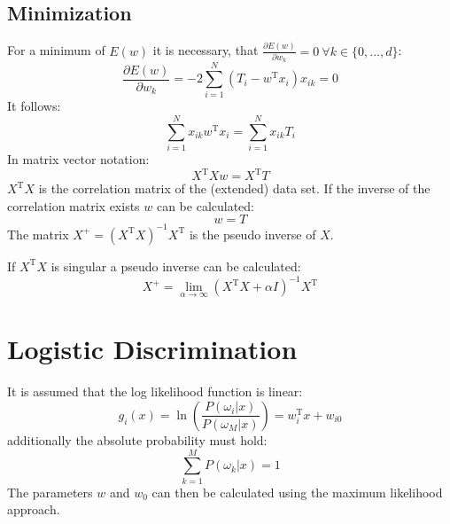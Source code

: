 \subsection{Minimization}
For a minimum of $E(w)$ it is necessary, that $\frac{\partial E(w)}{\partial w_k} = 0\ \forall k \in \{0, \ldots, d\}$:
\begin{equation*}
    \frac{\partial E(w)}{\partial w_k} = -2 \sum_{i=1}^N (T_i - w^\text{T} x_i) x_{ik} = 0
\end{equation*}
It follows:
\begin{equation*}
    \sum_{i=1}^N x_{ik} w^\text{T} x_i = \sum_{i=1}^N x_{ik} T_i 
\end{equation*}
In matrix vector notation:
\begin{equation*}
    X^\text{T} X w = X^\text{T} T
\end{equation*}
$X^\text{T}X$ is the correlation matrix of the (extended) data set.
If the inverse of the correlation matrix exists $w$ can be calculated:
\begin{equation*}
    w =  T
\end{equation*}
The matrix $X^+ = {(X^\text{T} X)}^{-1} X^\text{T}$ is the pseudo inverse of $X$.

If $X^\text{T}X$ is singular a pseudo inverse can be calculated:
\begin{equation*}
    X^+ = \lim_{\alpha \to \infty} {(X^\text{T} X + \alpha I)}^{-1} X^\text{T}
\end{equation*}

\section{Logistic Discrimination}
It is assumed that the log likelihood function is linear:
\begin{equation*}
    g_i(x) = \ln \left( \frac{P(\omega_i | x)}{P(\omega_M | x)} \right) = w^\text{T}_i x + w_{i0}
\end{equation*}
additionally the absolute probability must hold:
\begin{equation*}
    \sum_{k=1}^M P(\omega_k | x) = 1
\end{equation*}
The parameters $w$ and $w_0$ can then be calculated using the maximum likelihood approach.

